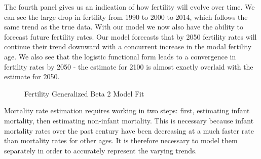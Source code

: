 \documentclass[10pt]{article}
\renewcommand{\thesection}{\arabic{section}}
\renewcommand{\thesubsection}{\thesection.\arabic{subsection}}
\renewcommand{\thesubsubsection}{\thesubsection.\arabic{subsubsection}}
\renewcommand{\subsubsection}[2][]{\oldsubsubsection[#1]{#2}\index{#1}\label{sec:\thesubsubsection}}
\numberwithin{equation}{subsection}
\newcommand*{\FigureDir}{../../graphs}
\begin{document}
\par The fourth panel gives us an indication of how fertility will evolve over time. We can see the large drop in fertility from 1990 to 2000 to 2014, which follows the same trend as the true data. With our model we now also have the ability to forecast future fertility rates. Our model forecasts that by 2050 fertility rates will continue their trend downward with a concurrent increase in the modal fertility age. We also see that the logistic functional form leads to a convergence in fertility rates by 2050 - the estimate for 2100 is almost exactly overlaid with the estimate for 2050.

\begin{figure}[!ht]
   \centering
   \caption{\label{fig:\thesubsubsection.3}Fertility Generalized Beta 2 Model Fit}
\end{figure}


\subsubsection{Mortality Rates}

\par Mortality rate estimation requires working in two steps: first, estimating infant mortality, then estimating non-infant mortality. This is necessary because infant mortality rates over the past century have been decreasing at a much faster rate than mortality rates for other ages. It is therefore necessary to model them separately in order to accurately represent the varying trends.
\end{document}
